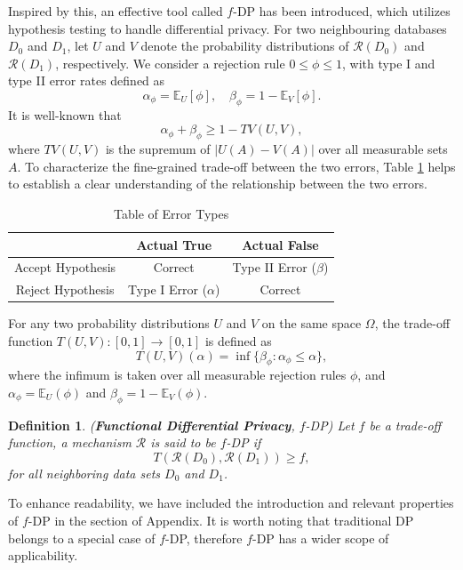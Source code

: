 \documentclass[letterpaper]{article} %
\newtheorem{definition}{Definition}
\begin{document}
Inspired by this, an effective tool called $f$-DP \cite{Dong2022gaussian} has been introduced, which utilizes hypothesis testing to handle differential privacy.
For two neighbouring databases $D_0$ and $D_1$, let $U$ and $V$ denote the probability distributions of $\mathcal{R}(D_0)$ and $\mathcal{R}(D_1)$, respectively. We consider a rejection rule $0 \leq \phi \leq 1$, with type I and type II error rates defined as
\begin{equation}\label{TypeError}
\alpha_\phi = \mathbb{E}_U[\phi], \quad \beta_{\phi} = 1-\mathbb{E}_V[\phi].
\end{equation}
It is well-known that
\begin{equation}\label{Tv2beta}
    \alpha_\phi+\beta_\phi \geq 1 - TV(U,V),
\end{equation}
where $TV(U,V)$ is the supremum of $|U(A)-V(A)|$ over all measurable sets $A$. To characterize the fine-grained trade-off between the two errors, Table \ref{Tab:TwoErrors} helps to establish a clear understanding of the relationship between the two errors.

\begin{table}[ht]
\caption{Table of Error Types}
\setlength{\tabcolsep}{3pt} %
\centering
\begin{tabular}{|c|c|c|}
\hline
 & Actual True & Actual False \\
\hline
Accept Hypothesis & Correct  & Type II Error ($\beta$) \\
\hline
Reject Hypothesis & Type I Error ($\alpha$) & Correct  \\
\hline
\end{tabular}
\label{Tab:TwoErrors}
\end{table}


For any two probability distributions $U$ and $V$ on the same space $\Omega$, the trade-off function $T(U,V):[0,1]\rightarrow [0,1]$ is defined as
\begin{equation}
T(U,V)(\alpha) = \inf\{\beta_\phi: \alpha_\phi \leq \alpha \},
\end{equation}
where the infimum is taken over all measurable rejection rules $\phi$, and $\alpha_{\phi}=\mathbb{E}_U(\phi)$ and $\beta_{\phi}=1-\mathbb{E}_V(\phi)$.

\begin{definition} ({\bf Functional Differential Privacy}, $f$-DP)
Let $f$ be a trade-off function, a mechanism $\mathcal{R}$ is said to be $f$-DP if
\begin{equation}
T(\mathcal{R}(D_0),\mathcal{R}(D_1)) \ge f,
\end{equation}
for all neighboring data sets $D_0$ and $D_1$.
\end{definition}
To enhance readability, we have included the introduction and relevant properties of
$f$-DP in the section of Appendix. It is worth noting that traditional DP belongs to a special case of $f$-DP, therefore $f$-DP has a wider scope of applicability.
\end{document}
